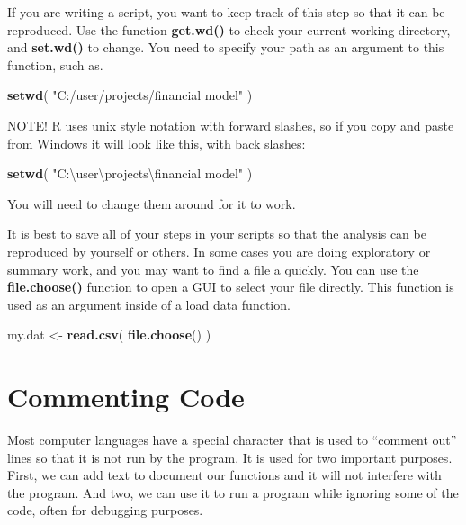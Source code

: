 \documentclass[]{book}
\newenvironment{Shaded}{\begin{snugshade}}{\end{snugshade}}
\newcommand{\CharTok}[1]{\textcolor[rgb]{0.31,0.60,0.02}{#1}}
\newcommand{\KeywordTok}[1]{\textcolor[rgb]{0.13,0.29,0.53}{\textbf{#1}}}
\newcommand{\NormalTok}[1]{#1}
\newcommand{\StringTok}[1]{\textcolor[rgb]{0.31,0.60,0.02}{#1}}
\theoremstyle{definition}
\theoremstyle{definition}
\theoremstyle{definition}
\theoremstyle{remark}
\begin{document}
If you are writing a script, you want to keep track of this step so that
it can be reproduced. Use the function \textbf{get.wd()} to check your
current working directory, and \textbf{set.wd()} to change. You need to
specify your path as an argument to this function, such as.

\begin{Shaded}
\begin{Highlighting}[]
\KeywordTok{setwd}\NormalTok{( }\StringTok{"C:/user/projects/financial model"}\NormalTok{ )}
\end{Highlighting}
\end{Shaded}

NOTE! R uses unix style notation with forward slashes, so if you copy
and paste from Windows it will look like this, with back slashes:

\begin{Shaded}
\begin{Highlighting}[]
\KeywordTok{setwd}\NormalTok{( }\StringTok{"C:\textbackslash{}user\textbackslash{}projects}\CharTok{\textbackslash{}f}\StringTok{inancial model"}\NormalTok{ )}
\end{Highlighting}
\end{Shaded}

You will need to change them around for it to work.

It is best to save all of your steps in your scripts so that the
analysis can be reproduced by yourself or others. In some cases you are
doing exploratory or summary work, and you may want to find a file a
quickly. You can use the \textbf{file.choose()} function to open a GUI
to select your file directly. This function is used as an argument
inside of a load data function.

\begin{Shaded}
\begin{Highlighting}[]
\NormalTok{my.dat <-}\StringTok{ }\KeywordTok{read.csv}\NormalTok{( }\KeywordTok{file.choose}\NormalTok{() )}
\end{Highlighting}
\end{Shaded}

\hypertarget{commenting-code}{%
\section{Commenting Code}\label{commenting-code}}

Most computer languages have a special character that is used to
``comment out'' lines so that it is not run by the program. It is used
for two important purposes. First, we can add text to document our
functions and it will not interfere with the program. And two, we can
use it to run a program while ignoring some of the code, often for
debugging purposes.
\end{document}
